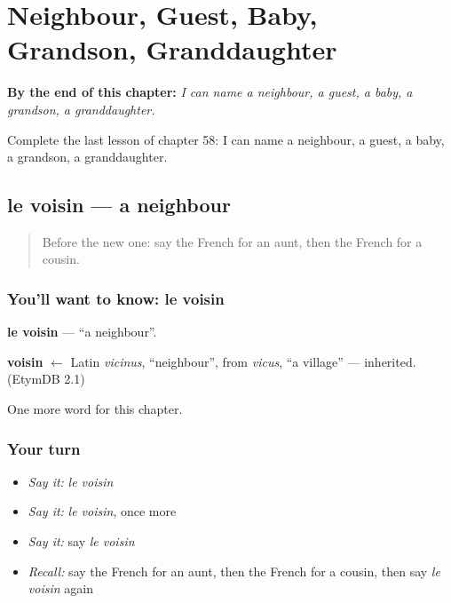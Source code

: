 
\chapter{Neighbour, Guest, Baby, Grandson, Granddaughter}
\label{ch:fr-neighbour-guest-baby-grandson-granddaughter}

\begin{chapteropening}
\textbf{By the end of this chapter:} \emph{I can name a neighbour, a guest, a baby, a grandson, a granddaughter.}

Complete the last lesson of chapter 58: I can name a neighbour, a guest, a baby, a grandson, a granddaughter.
\end{chapteropening}

\section[le voisin]{le voisin — a neighbour}

\label{lesson:FR-C58-voisin}



\begin{quote}
Before the new one: say the French for an aunt, then the French for a cousin.
\end{quote}

\subsection*{You'll want to know: le voisin}
\textbf{le voisin} — \textquotedblleft{}a neighbour\textquotedblright{}.

\begin{cousinweb}
\textbf{voisin} $\leftarrow$ Latin \emph{vicinus}, \textquotedblleft{}neighbour\textquotedblright{}, from \emph{vicus}, \textquotedblleft{}a village\textquotedblright{} — inherited. (EtymDB 2.1)
\end{cousinweb}

\begin{grammarlens}[title={What you've built}]
One more word for this chapter.
\end{grammarlens}

\subsection*{Your turn}
\begin{itemize}
\raggedright
  \item \emph{Say it:} \emph{le voisin}
  \item \emph{Say it:} \emph{le voisin}, once more
  \item \emph{Say it:} say \emph{le voisin}
  \item \emph{Recall:} say the French for an aunt, then the French for a cousin, then say \emph{le voisin} again
\end{itemize}

